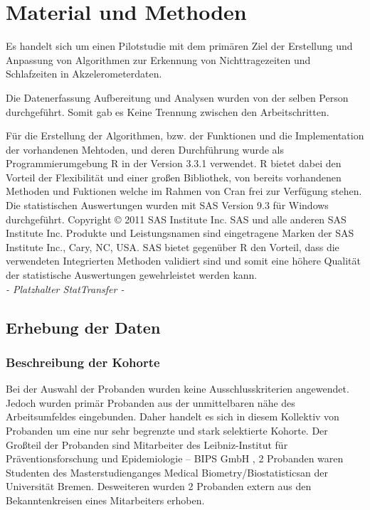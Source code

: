 \chapter{Material und Methoden}
Es handelt sich um einen Pilotstudie mit dem primären Ziel der Erstellung und Anpassung von Algorithmen zur Erkennung von Nichttragezeiten und Schlafzeiten in Akzelerometerdaten.

Die Datenerfassung Aufbereitung und Analysen wurden von der selben Person durchgeführt. Somit gab es Keine Trennung zwischen den Arbeitschritten.

Für die Erstellung der Algorithmen, bzw. der Funktionen und die Implementation der vorhandenen Mehtoden, und deren Durchführung wurde als Programmierumgebung R \cite{RMan} in der Version 3.3.1 verwendet.
R bietet dabei den Vorteil der Flexibilität und einer großen Bibliothek, von bereits vorhandenen Methoden und Fuktionen welche im Rahmen von Cran frei zur Verfügung stehen.\\

Die statistischen Auswertungen wurden mit SAS Version 9.3 für Windows durchgeführt. Copyright © 2011 SAS Institute Inc. SAS und alle anderen SAS Institute Inc. Produkte und Leistungsnamen sind eingetragene Marken der SAS Institute Inc., Cary, NC, USA.
SAS bietet gegenüber R den Vorteil, dass die verwendeten Integrierten Methoden validiert sind und somit eine höhere Qualität der statistische Auswertungen gewehrleistet werden kann. \\

\textit{- Platzhalter StatTransfer -}

\section{Erhebung der Daten}

\subsection{Beschreibung der Kohorte}
Bei der Auswahl der Probanden wurden keine Ausschlusskriterien angewendet. Jedoch wurden primär Probanden aus der unmittelbaren nähe des Arbeitsumfeldes eingebunden. Daher handelt es sich in diesem Kollektiv von Probanden um eine nur sehr begrenzte und stark selektierte Kohorte.
Der Großteil der Probanden sind Mitarbeiter des \glqq Leibniz-Institut für Präventionsforschung und Epidemiologie – BIPS GmbH \grqq, 2 Probanden waren Studenten des Masterstudienganges \glqq Medical Biometry/Biostatistics\grqq an der Universität Bremen. Desweiteren wurden 2 Probanden extern aus den Bekanntenkreisen eines Mitarbeiters erhoben.



